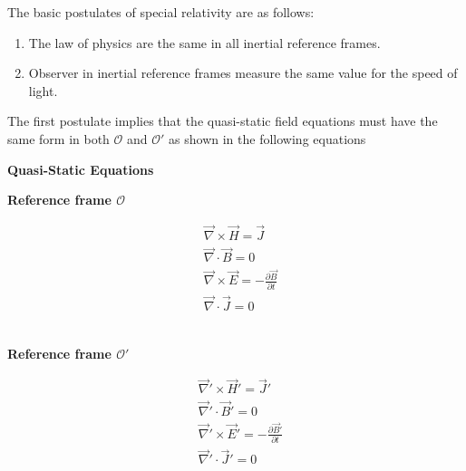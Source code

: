 \documentclass[11pt,a4paper,oneside]{book}
\numberwithin{equation}{section}
\theoremstyle{it}
\theoremstyle{definition}
\begin{document}
The basic postulates of special relativity are as follows:
\begin{enumerate}
	\item The law of physics are the same in all inertial reference frames.
	\item Observer in inertial reference frames measure the same value for the 
	speed of light.
\end{enumerate}
The first postulate implies that the quasi-static field equations must have the 
same form in both  $\mathcal{O}$ and $\mathcal{O'}$ as shown in the following 
equations
\begin{mybox}
	\bigskip
	\centerline{\textbf{Quasi-Static Equations}}
	\begin{multicols}{2}
		\centerline{\textbf{Reference frame $\mathcal{O}$}}
		\begin{equation}
			\begin{aligned}
				&\vec{\nabla}\times\vec{H} = \vec{J} \\[6pt]
				&\vec{\nabla}\cdot\vec{B} = 0 \\[6pt]
				&\vec{\nabla}\times\vec{E} = -\frac{\partial\vec{B}}{\partial 
				t} \\[6pt]
				&\vec{\nabla}\cdot\vec{J} = 0
			\end{aligned}
		\end{equation}
		\ \newline
		\columnbreak
		\ \newline
		\centerline{\textbf{Reference frame $\mathcal{O'}$}}	
		\begin{equation}\label{maxwell_eq_moving_frame}
			\begin{aligned}
				&\vec{\nabla}'\times\vec{H}' = \vec{J}' \\[6pt]
				&\vec{\nabla}'\cdot\vec{B}' = 0 \\[6pt]
				&\vec{\nabla}'\times\vec{E}' = 
				-\frac{\partial\vec{B}'}{\partial t} \\[6pt]
				&\vec{\nabla}'\cdot\vec{J}' = 0
			\end{aligned}
		\end{equation} 
		\ \newline
	\end{multicols}
\end{mybox}
\end{document}
